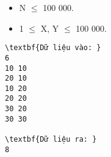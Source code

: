\begin{itemize}
	\item N  $\le$  100 000.
	\item 1  $\le$  X, Y  $\le$  100 000.
\end{itemize}
\begin{verbatim}
\textbf{Dữ liệu vào: }
6
10 10
20 10
10 20
20 20
30 20
30 30

\textbf{Dữ liệu ra: }
8\end{verbatim}